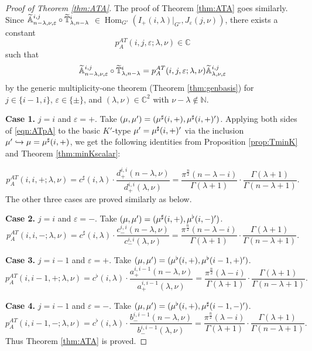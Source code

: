 \begin{proof}
[Proof of Theorem \ref{thm:ATA}]
The proof of Theorem \ref{thm:ATA} goes similarly.  
Since ${\widetilde{\mathbb{A}}}_{{n-\lambda},{\nu},{\varepsilon}}^{{i,j}} \circ
\widetilde{{\mathbb{T}}}_{{\lambda},{n-\lambda}}^{{i}}$
$\in \operatorname{Hom}_{G'}(I_+(i,\lambda)|_{G'}, J_{\varepsilon}(j,\nu))$, 
 there exists a constant 
\[
   p_A^{AT}(i,j,\varepsilon;\lambda,\nu)\in {\mathbb{C}}
\]
 such that
\begin{equation}
\label{eqn:ATpA}
  {\widetilde{\mathbb{A}}}_{{n-\lambda},{\nu},{\varepsilon}}^{{i,j}}
  \circ
  \widetilde{{\mathbb{T}}}_{{\lambda},{n-\lambda}}^{{i}}
  =
  p_A ^{AT}(i,j,\varepsilon;\lambda, \nu)
  {\widetilde{\mathbb{A}}}_{{\lambda},{\nu},{\varepsilon}}^{{i,j}}
\end{equation}
by the generic multiplicity-one theorem 
 (Theorem \ref{thm:genbasis})
for $j \in \{i-1,i\}$, 
 $\varepsilon \in \{\pm\}$, 
 and $(\lambda,\nu) \in {\mathbb{C}}^2$
 with $\nu-\lambda \not \in {\mathbb{N}}$.  
\par\noindent
{\bf{Case 1.}}\enspace
$j=i$ and $\varepsilon=+$.  
Take $(\mu,\mu')=(\mu^{\sharp}(i,+), \mu^{\sharp}(i,+)')$. 
Applying both sides of \eqref{eqn:ATpA}
 to the basic $K'$-type $\mu'=\mu^{\sharp}(i,+)'$
 via the inclusion $\mu' \hookrightarrow \mu = \mu^{\sharp}(i,+)$, 
 we get the following identities from 
 Proposition \ref{prop:TminK}
 and Theorem \ref{thm:minKscalar}:

\[
   p_A ^{AT}(i,i,+;\lambda, \nu)
   =
   c^{\sharp}(i,\lambda)
   \cdot
   \frac{d_+^{i,i}(n-\lambda, \nu)}{d_+^{i,i}(\lambda, \nu)}
   =
   \frac{\pi^{\frac{n}{2}}(n-\lambda-i)}{\Gamma(\lambda+1)}
   \cdot 
   \frac{\Gamma(\lambda+1)}{\Gamma(n-\lambda+1)}.  
\]
The other three cases are proved similarly as below.  
\par\noindent
{\bf{Case 2.}}\enspace
$j=i$ and $\varepsilon=-$.  
Take $(\mu,\mu')=(\mu^{\sharp}(i,+), \mu^{\flat}(i,-)')$. 
\[
   p_A ^{AT}(i,i,-;\lambda, \nu)
   =
   c^{\sharp}(i,\lambda)
   \cdot
   \frac{c_-^{i,i}(n-\lambda, \nu)}{c_-^{i,i}(\lambda, \nu)}
   =
   \frac{\pi^{\frac{n}{2}}(n-\lambda-i)}{\Gamma(\lambda+1)}
   \cdot 
   \frac{\Gamma(\lambda+1)}{\Gamma(n-\lambda+1)}.  
\]
\par\noindent
{\bf{Case 3.}}\enspace
$j=i-1$ and $\varepsilon=+$.  
Take $(\mu,\mu')=(\mu^{\flat}(i,+), \mu^{\flat}(i-1,+)')$. 
\[
   p_A ^{AT}(i,i-1,+;\lambda, \nu)
   =
   c^{\flat}(i,\lambda)
   \cdot
   \frac{a_+^{i,i-1}(n-\lambda, \nu)}{a_+^{i,i-1}(\lambda, \nu)}
   =
   \frac{\pi^{\frac{n}{2}}(\lambda-i)}{\Gamma(\lambda+1)}
   \cdot 
   \frac{\Gamma(\lambda+1)}{\Gamma(n-\lambda+1)}.  
\]
\par\noindent
{\bf{Case 4.}}\enspace
$j=i-1$ and $\varepsilon=-$.  
Take $(\mu,\mu')=(\mu^{\flat}(i,+), \mu^{\sharp}(i-1,-)')$. 
\[
   p_A ^{AT}(i,i-1,-;\lambda, \nu)
   =
   c^{\flat}(i,\lambda)
   \cdot
   \frac{b_-^{i,i-1}(n-\lambda, \nu)}{b_-^{i,i-1}(\lambda, \nu)}
   =
   \frac{\pi^{\frac{n}{2}}(\lambda-i)}{\Gamma(\lambda+1)}
   \cdot 
   \frac{\Gamma(\lambda+1)}{\Gamma(n-\lambda+1)}.  
\]
Thus Theorem \ref{thm:ATA} is proved.  
\end{proof}

